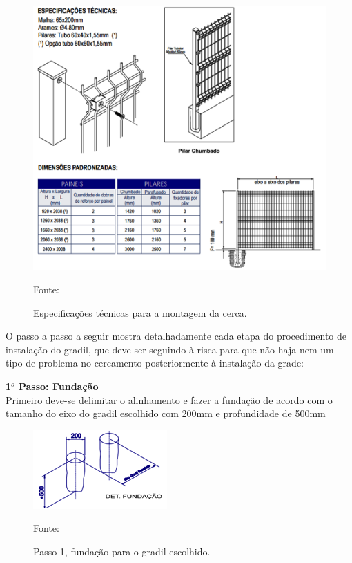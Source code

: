 \begin{figure}[H]
	\centering
	\label{EspecificacoesTecnicasCerca}
		\includegraphics[keepaspectratio=true,scale=0.8]{figuras/EspecificacoesTecnicasCerca.png}
	\caption{Especifica\c{c}\~oes t\'ecnicas para a montagem da cerca.}
	\small{Fonte: \cite{CatalogoCercamento}}
\end{figure}

O passo a passo a seguir mostra detalhadamente cada etapa do procedimento de instala\c{c}\~ao do gradil, que deve ser seguindo \`a risca para que n\~ao haja nem um tipo de problema no cercamento posteriormente \`a instala\c{c}\~ao da grade: 

\textbf{1$^{o}$ Passo: Funda\c{c}\~ao} \\ Primeiro deve-se delimitar o alinhamento e fazer a funda\c{c}\~ao de acordo com o tamanho do eixo do gradil escolhido com 200mm e profundidade de 500mm

\begin{figure}[H]
	\centering
	\label{GradilEscolhido}
		\includegraphics[keepaspectratio=true,scale=0.9]{figuras/GradilEscolhido.png}
	\caption{Passo 1, funda\c{c}\~ao para o gradil escolhido.}
	\small{Fonte: \cite{CatalogoCercamento}}
\end{figure}

